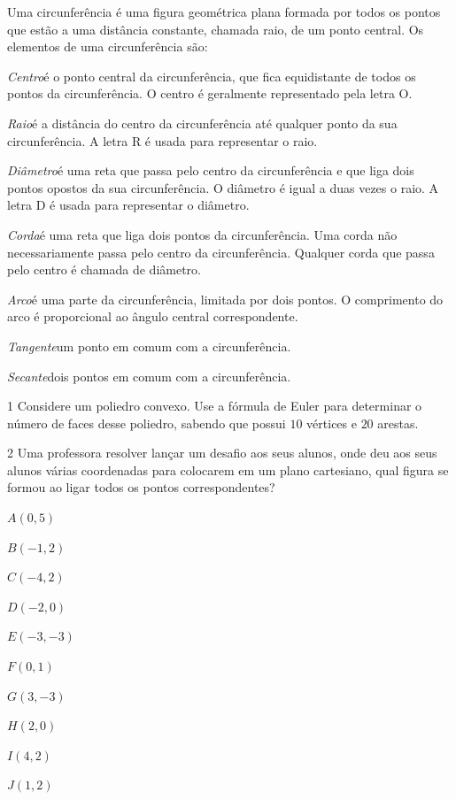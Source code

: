 {{\noindent Uma circunferência é uma figura geométrica plana formada por todos os
pontos que estão a uma distância constante, chamada raio, de um ponto
central. Os elementos de uma circunferência são:

\noindent\textit{Centro}\quad é o ponto central da circunferência, que fica equidistante de
todos os pontos da circunferência. O centro é geralmente representado
pela letra O.

\noindent\textit{Raio}\quad é a distância do centro da circunferência até qualquer ponto da
sua circunferência. A letra R é usada para representar o raio.

\noindent\textit{Diâmetro}\quad é uma reta que passa pelo centro da circunferência e que liga
dois pontos opostos da sua circunferência. O diâmetro é igual a duas
vezes o raio. A letra D é usada para representar o diâmetro.

\noindent\textit{Corda}\quad é uma reta que liga dois pontos da circunferência. Uma corda não
necessariamente passa pelo centro da circunferência. Qualquer corda que
passa pelo centro é chamada de diâmetro.

\noindent\textit{Arco}\quad é uma parte da circunferência, limitada por dois pontos. O
comprimento do arco é proporcional ao ângulo central correspondente.

\noindent\textit{Tangente}\quad um ponto em comum com a circunferência.

\noindent\textit{Secante}\quad dois pontos em comum com a circunferência.}


\num{1}  Considere um poliedro convexo. Use a fórmula de Euler para determinar
o número de faces desse poliedro, sabendo que possui $10$ vértices e $20$
arestas.


\num{2}  Uma professora resolver lançar um desafio aos seus alunos, onde deu
aos seus alunos várias coordenadas para colocarem em um plano
cartesiano, qual figura se formou ao ligar todos os pontos
correspondentes?

\begin{escolha}
\item $A (0,5)$
\item $B (-1,2)$
\item $C (-4,2)$
\item $D (-2,0)$
\item $E (-3,-3)$
\item $F (0,1)$
\item $G (3,-3)$
\item $H (2,0)$
\item $I (4,2)$
\item $J (1,2)$
\end{escolha}

}
